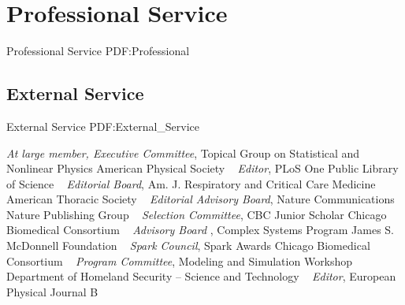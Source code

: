 \section
{Professional Service}
{Professional Service}
{PDF:Professional}

\subsection
{External Service}
{External Service}
{PDF:External_Service}

\GapNoBreak
{}
\textit{At large member, Executive Committee},
    Topical Group on Statistical and Nonlinear Physics
    \newline
American Physical Society
\newline
~
\Gap
{}
\textit{Editor},
    PLoS One
    \newline
Public Library of Science
\newline
~
\Gap
{}
\textit{Editorial Board},
    Am. J. Respiratory and Critical Care Medicine
    \newline
American Thoracic Society
\newline
~
\Gap
{}
\textit{Editorial Advisory Board},
    Nature Communications
    \newline
Nature Publishing Group
\newline
~
\Gap
{}
\textit{Selection Committee},
    CBC Junior Scholar
    \newline
Chicago Biomedical Consortium
\newline
~
\Gap
{}
\textit{Advisory Board },
    Complex Systems Program
    \newline
James S. McDonnell Foundation
\newline
~
\Gap
{}
\textit{Spark Council},
    Spark Awards
    \newline
Chicago Biomedical Consortium
\newline
~
\Gap
{}
\textit{Program Committee},
    Modeling and Simulation Workshop
    \newline
Department of Homeland Security -- Science and Technology
\newline
~
\Gap
{}
\textit{Editor},
    European Physical Journal B

